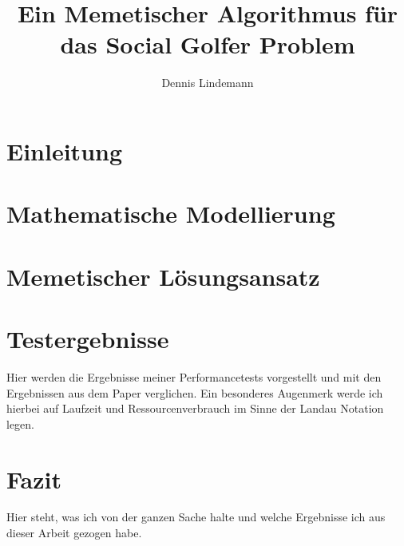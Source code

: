 \documentclass[draft]{tcs-seminar}
\begin{document}
\title{Ein Memetischer Algorithmus für das Social Golfer Problem}
\author{Dennis Lindemann}

\begin{abstract}

\end{abstract}

\maketitle


\section{Einleitung}
  


\section{Mathematische Modellierung}
    


\section{Memetischer Lösungsansatz}
  

\section{Testergebnisse}
Hier werden die Ergebnisse meiner Performancetests vorgestellt und mit den Ergebnissen aus dem Paper verglichen. Ein besonderes Augenmerk werde ich hierbei auf Laufzeit und Ressourcenverbrauch im Sinne der Landau Notation legen.



\section{Fazit}
Hier steht, was ich von der ganzen Sache halte und welche Ergebnisse ich aus dieser Arbeit gezogen habe.

\begin{thebibliography}{9}  
    
\end{thebibliography}
\end{document}
